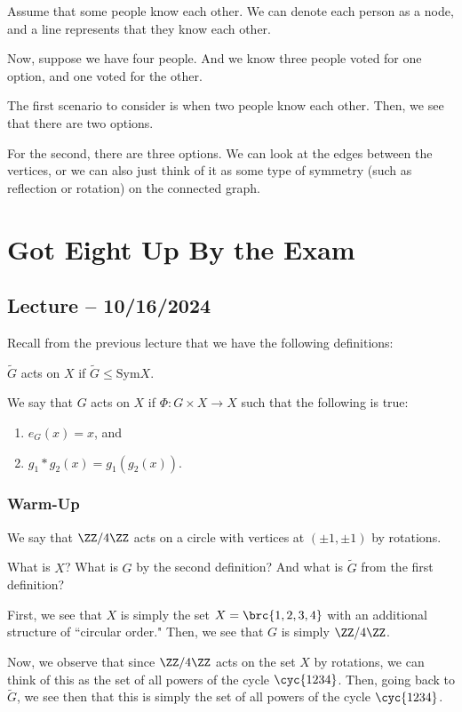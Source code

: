 \documentclass[openany]{book}
\begin{document}
\begin{example}
	Assume that some people know each other. We can denote each person as a node, and a line represents that they know each other.
	
	Now, suppose we have four people. And we know three people voted for one option, and one voted for the other.
	
	The first scenario to consider is when two people know each other. Then, we see that there are two options.
	
	For the second, there are three options. We can look at the edges between the vertices, or we can also just think of it as some type of symmetry (such as reflection or rotation) on the connected graph.
\end{example}

\chapter{Got Eight Up By the Exam}
\section{Lecture -- 10/16/2024}
Recall from the previous lecture that we have the following definitions:
\begin{defn}
	$\tilde{G}$ acts on $X$ if $\tilde{G} \leq \mathrm{Sym} X$.
\end{defn}

\begin{defn}
	We say that $G$ acts on $X$ if $\Phi: G \times X \rightarrow X$ such that the following is true:
	\begin{enumerate}
		\item $e_G(x) = x$, and
		\item $g_1*g_2(x) = g_1(g_2(x))$.
	\end{enumerate}
\end{defn}

\subsection{Warm-Up}
We say that $\ZZ/4\ZZ$ acts on a circle with vertices at $(\pm 1, \pm 1)$ by rotations.

\begin{hw}
	What is $X$? What is $G$ by the second definition? And what is $\tilde{G}$ from the first definition?
\end{hw}
\begin{solution}
	First, we see that $X$ is simply the set $X = \brc{1,2,3,4}$ with an additional structure of ``circular order." Then, we see that $G$ is simply $\ZZ/4\ZZ$.
	
	Now, we observe that since $\ZZ/4\ZZ$ acts on the set $X$ by rotations, we can think of this as the set of all powers of the cycle $\cyc{1 2 3 4}$. Then, going back to $\tilde{G}$, we see then that this is simply the set of all powers of the cycle $\cyc{1 2 3 4}$.
\end{solution}
\end{document}
